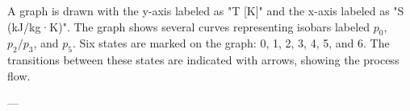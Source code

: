 A graph is drawn with the y-axis labeled as "T [K]" and the x-axis labeled as "S (kJ/kg·K)". The graph shows several curves representing isobars labeled \( p_0 \), \( p_2/p_3 \), and \( p_5 \). Six states are marked on the graph: 0, 1, 2, 3, 4, 5, and 6. The transitions between these states are indicated with arrows, showing the process flow.

---